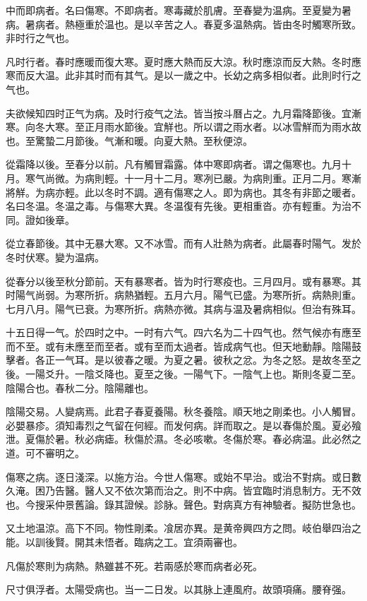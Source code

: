 \documentclass[12pt,oneside,UTF8,b5paper]{ctexbook}她她她她她她她
\begin{document}
中而即病者。名曰傷寒。不即病者。寒毒藏於肌膚。至春變为温病。至夏變为暑病。暑病者。熱極重於温也。是以辛苦之人。春夏多温熱病。皆由冬时觸寒所致。非时行之气也。

凡时行者。春时應暖而復大寒。夏时應大熱而反大涼。秋时應涼而反大熱。冬时應寒而反大温。此非其时而有其气。是以一歲之中。长幼之病多相似者。此則时行之气也。

夫欲候知四时正气为病。及时行疫气之法。皆当按斗曆占之。九月霜降節後。宜漸寒。向冬大寒。至正月雨水節後。宜觧也。所以谓之雨水者。以冰雪觧而为雨水故也。至驚蟄二月節後。气漸和暖。向夏大熱。至秋便涼。

從霜降以後。至春分以前。凡有觸冒霜露。体中寒即病者。谓之傷寒也。九月十月。寒气尚微。为病則輕。十一月十二月。寒冽已嚴。为病則重。正月二月。寒漸將觧。为病亦輕。此以冬时不調。適有傷寒之人。即为病也。其冬有非節之暖者。名曰冬温。冬温之毒。与傷寒大異。冬温復有先後。更相重沓。亦有輕重。为治不同。證如後章。

從立春節後。其中无暴大寒。又不冰雪。而有人壯熱为病者。此屬春时陽气。发於冬时伏寒。變为温病。

從春分以後至秋分節前。天有暴寒者。皆为时行寒疫也。三月四月。或有暴寒。其时陽气尚弱。为寒所折。病熱猶輕。五月六月。陽气已盛。为寒所折。病熱則重。七月八月。陽气已衰。为寒所折。病熱亦微。其病与温及暑病相似。但治有殊耳。

十五日得一气。於四时之中。一时有六气。四六名为二十四气也。然气候亦有應至而不至。或有未應至而至者。或有至而太過者。皆成病气也。但天地動靜。陰陽鼓擊者。各正一气耳。是以彼春之暖。为夏之暑。彼秋之忿。为冬之怒。是故冬至之後。一陽爻升。一陰爻降也。夏至之後。一陽气下。一陰气上也。斯則冬夏二至。陰陽合也。春秋二分。陰陽離也。

陰陽交易。人變病焉。此君子春夏養陽。秋冬養陰。順天地之剛柔也。小人觸冒。必嬰暴疹。須知毒烈之气留在何經。而发何病。詳而取之。是以春傷於風。夏必飱泄。夏傷於暑。秋必病瘧。秋傷於濕。冬必咳嗽。冬傷於寒。春必病温。此必然之道。可不審明之。

傷寒之病。逐日淺深。以施方治。今世人傷寒。或始不早治。或治不對病。或日數久淹。困乃告醫。醫人又不依次第而治之。則不中病。皆宜臨时消息制方。无不效也。今搜采仲景舊論。錄其證候。診脉。聲色。對病真方有神驗者。擬防世急也。

又土地温涼。高下不同。物性剛柔。飡居亦異。是黄帝興四方之問。岐伯舉四治之能。以訓後賢。開其未悟者。臨病之工。宜須兩審也。

凡傷於寒則为病熱。熱雖甚不死。若兩感於寒而病者必死。

尺寸俱浮者。太陽受病也。当一二日发。以其脉上連風府。故頭項痛。腰脊强。
\end{document}
